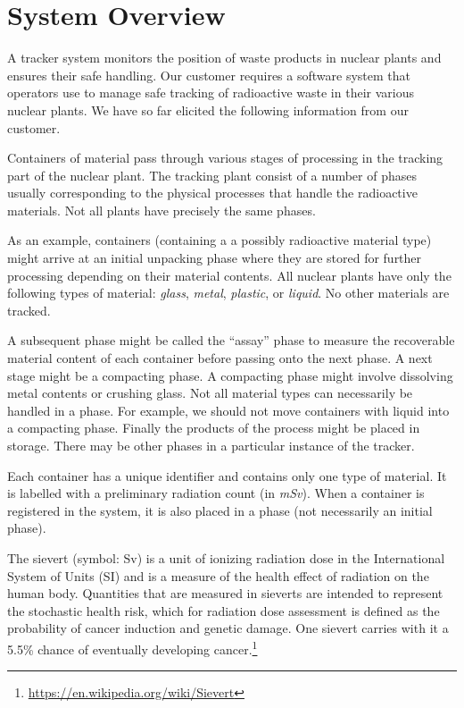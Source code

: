 \documentclass[fontsize=12pt,paper=letter,twoside]{scrartcl}
\begin{document}
\tableofcontents
\listoffigures
\listoftables
\newpage


\section{System Overview}

A tracker system monitors the position of waste products in nuclear plants and ensures their safe handling. Our customer requires a software system that operators use to manage safe tracking of radioactive waste in their various nuclear plants. We have so far elicited the following information from our customer.

Containers of material pass through various stages of processing in the tracking part of the nuclear plant. The tracking plant consist of a number of phases usually corresponding to the physical processes that handle the radioactive materials. Not all plants have precisely the same phases.

As an example, containers (containing a a possibly radioactive material type) might arrive at an initial unpacking phase where they are stored for further processing depending on their material contents. All nuclear plants have only the following types of material: \textit{glass}, \textit{metal}, \textit{plastic}, or \textit{liquid}. No other materials are tracked.

A subsequent phase might be called the ``assay” phase to measure the recoverable material content of each container before passing onto the next phase. A next stage might be a compacting phase. A compacting phase might involve dissolving metal contents or crushing glass. Not all material types can necessarily be handled in a phase. For example, we should not move containers with liquid into a compacting phase. Finally the products of the process might be placed in storage. There may be other phases in a particular instance of the tracker.

Each container has a unique identifier and contains only one type of material. It is labelled with a preliminary radiation count (in \textit{mSv}). When a container is registered in the system, it is also placed in a phase (not necessarily an initial phase).

The sievert (symbol: Sv) is a unit of ionizing radiation dose in the International System of Units (SI) and is a measure of the health effect of radiation on the human body. Quantities that are measured in sieverts are intended to represent the stochastic health risk, which for radiation dose assessment is defined as the probability of cancer induction and genetic damage. One sievert carries with it a 5.5\% chance of eventually developing cancer.\footnote{\url{https://en.wikipedia.org/wiki/Sievert}}
\end{document}
